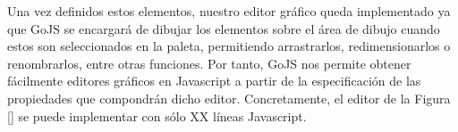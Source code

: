 
Una vez definidos estos elementos, nuestro editor gráfico queda implementado ya que GoJS se encargará de dibujar los elementos sobre el área de dibujo cuando estos son seleccionados en la paleta, permitiendo arrastrarlos, redimensionarlos o renombrarlos, entre otras funciones. Por tanto, GoJS nos permite obtener fácilmente editores gráficos en Javascript a partir de la especificación
de las propiedades que compondrán dicho editor. Concretamente, el editor de la Figura \ref{} se puede implementar con sólo XX líneas Javascript.     